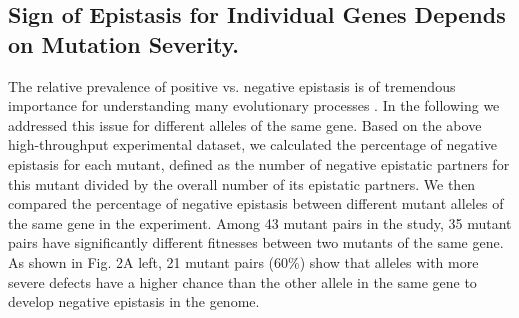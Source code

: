 \subsection{Sign of Epistasis for Individual Genes Depends on Mutation
Severity.}

The relative prevalence of positive vs. negative epistasis is of
tremendous importance for understanding many evolutionary processes
\citep{Phillips2008, Boone2007, Kimura1966}. 
In the following we addressed this issue for different alleles
of the same gene. Based on the above high-throughput experimental
dataset, we calculated the percentage of negative epistasis for each
mutant, defined as the number of negative epistatic partners for this
mutant divided by the overall number of its epistatic partners. We
then compared the percentage of negative epistasis between different
mutant alleles of the same gene in the experiment. Among 43 mutant
pairs in the study, 35 mutant pairs have significantly different
fitnesses between two mutants of the same gene. As shown in Fig. 2A
left, 21 mutant pairs (60\%) show that alleles with more severe
defects have a higher chance than the other allele in the same gene to
develop negative epistasis in the genome.

